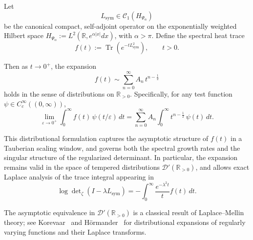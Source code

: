 \begin{lemma}
\label{lem:distributional_trace_asymptotics}
Let
\[
L_{\mathrm{sym}} \in \mathcal{C}_1(H_{\Psi_\alpha})
\]
be the canonical compact, self-adjoint operator on the exponentially weighted Hilbert space \( H_{\Psi_\alpha} := L^2(\mathbb{R}, e^{\alpha|x|} dx) \), with \( \alpha > \pi \). Define the spectral heat trace
\[
f(t) := \operatorname{Tr}(e^{-t L_{\mathrm{sym}}^2}), \qquad t > 0.
\]

Then as \( t \to 0^+ \), the expansion
\[
f(t) \sim \sum_{n=0}^\infty A_n \, t^{n - \frac{1}{2}}
\]
holds in the sense of distributions on \( \mathbb{R}_{>0} \). Specifically, for any test function \( \psi \in C_c^\infty((0, \infty)) \),
\[
\lim_{\varepsilon \to 0^+} \int_0^\infty f(t) \, \psi(t/\varepsilon) \, dt
= \sum_{n=0}^\infty A_n \int_0^\infty t^{n - \frac{1}{2}} \, \psi(t)\, dt.
\]

\medskip
\noindent
This distributional formulation captures the asymptotic structure of \( f(t) \) in a Tauberian scaling window, and governs both the spectral growth rates and the singular structure of the regularized determinant. In particular, the expansion remains valid in the space of tempered distributions \( \mathcal{D}'(\mathbb{R}_{>0}) \), and allows exact Laplace analysis of the trace integral appearing in
\[
\log \det\nolimits_{\zeta}(I - \lambda L_{\mathrm{sym}}) = - \int_0^\infty \frac{e^{-\lambda^2 t}}{t} f(t) \, dt.
\]

\medskip
\noindent
The asymptotic equivalence in \( \mathcal{D}'(\mathbb{R}_{>0}) \) is a classical result of Laplace–Mellin theory; see Korevaar~\cite[Ch.~IV]{Korevaar2004Tauberian} and Hörmander~\cite[Vol.~I, §7.1]{Hormander1983Analysis} for distributional expansions of regularly varying functions and their Laplace transforms.
\end{lemma}
